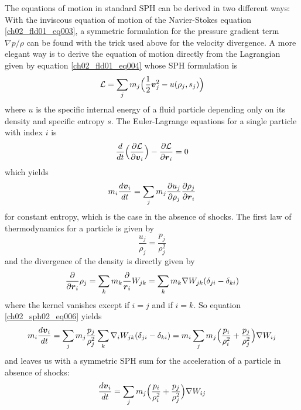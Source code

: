 The equations of motion in standard SPH can be derived in two different ways: With the inviscous equation of motion of the Navier-Stokes equation \ref{ch02_fld01_eq003}, a symmetric formulation for the pressure gradient term $\nabla p / \rho$ can be found with the trick used above for the velocity divergence. 
A more elegant way is to derive the equation of motion directly from the Lagrangian given by equation \ref{ch02_fld01_eq004} whose SPH formulation is
\begin{equation}
\label{ch02_sph02_eq004}
\mathcal{L} = \sum_{j} m_j \Big( \frac{1}{2} \boldsymbol{v}_j^2 - u(\rho_j, s_j) \Big) 
\end{equation}
where $u$ is the specific internal energy of a fluid particle depending only on its density and specific entropy $s$. The Euler-Lagrange equations for a single particle with index $i$ is
\begin{equation}
\label{ch02_sph02_eq005}
\frac{d}{dt} \Big( \frac{\partial \mathcal{L}}{\partial \boldsymbol{v}_i} \Big) - \frac{\partial \mathcal{L}}{\partial \boldsymbol{r}_i} = 0
\end{equation}
which yields 
\begin{equation}
\label{ch02_sph02_eq006}
m_i \frac{d \boldsymbol{v}_i }{dt} = \sum_{j} m_j \frac{\partial u_j}{\partial \rho_j} \frac{\partial \rho_j}{\partial \boldsymbol{r}_i}
\end{equation}
for constant entropy, which is the case in the absence of shocks. The first law of thermodynamics for a particle is given by
\begin{equation}
\label{ch02_sph02_eq007}
\frac{u_j}{\rho_j} = \frac{p_j}{\rho_j^2}
\end{equation}
and the divergence of the density is directly given by
\begin{equation}
\label{ch02_sph02_eq008}
\frac{\partial }{\partial \boldsymbol{r}_i} \rho_j
= \sum_{k} m_k \frac{\partial}{\boldsymbol{r}_i} W_{jk} 
= \sum_{k} m_k \nabla W_{jk} ( \delta_{ji} - \delta_{ki})
\end{equation}
where the kernel vanishes except if $i = j$ and if $i = k$. So equation \ref{ch02_sph02_eq006} yields
\begin{equation}
\label{ch02_sph02_eq009}
m_i \frac{d \boldsymbol{v}_i }{dt} = \sum_{j} m_j \frac{p_j}{\rho_j^2} \sum_{k} \nabla_i W_{jk} ( \delta_{ji} - \delta_{ki})\\
 = m_i \sum_{j} m_j \Big( \frac{p_i}{\rho_i^2} + \frac{p_j}{\rho_j^2} \Big) \nabla W_{ij}
\end{equation}
and leaves us with a symmetric SPH sum for the acceleration of a particle in absence of shocks:
\begin{equation}
\label{ch02_sph02_eq010}
\frac{d \boldsymbol{v}_i }{dt} = \sum_{j} m_j \Big( \frac{p_i}{\rho_i^2} + \frac{p_j}{\rho_j^2} \Big) \nabla W_{ij}
\end{equation}

